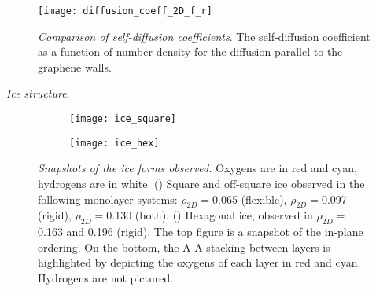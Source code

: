 \documentclass[12pt]{article}
\begin{document}
\begin{figure}[ht!]
	\centering
    \texttt{[image: diffusion\_coeff\_2D\_f\_r]}
	\caption{\textit{Comparison of self-diffusion coefficients}. The self-diffusion coefficient as a function of number density for the diffusion parallel to the graphene walls.}
	\label{fig:msd}
\end{figure}

\textit{Ice structure}.

\begin{figure}[ht!]
	\centering
	\begin{subfigure}[b]{0.395\textwidth}
    		\texttt{[image: ice\_square]}
		\caption{}
        		\label{fig:ice_sq}
  	\end{subfigure}
	\begin{subfigure}[b]{0.285\textwidth}
    		\texttt{[image: ice\_hex]}
		\caption{}
        		\label{fig:ice_hx}
  	\end{subfigure}
	\caption{\textit{Snapshots of the ice forms observed.} Oxygens are in red and cyan, hydrogens are in white. (\protect{}) Square and off-square ice observed in the following monolayer systems: \(\rho_{2D}=\)0.065 (flexible), \(\rho_{2D}=\)0.097 (rigid), \(\rho_{2D}=\)0.130 (both). (\protect{}) Hexagonal ice, observed in \(\rho_{2D}=\)0.163 and 0.196 (rigid). The top figure is a snapshot of the in-plane ordering. On the bottom, the A-A stacking between layers is highlighted by depicting the oxygens of each layer in red and cyan. Hydrogens are not pictured.}
	\label{fig:ice_figs}
\end{figure}

\clearpage
\printbibliography
\end{document}
